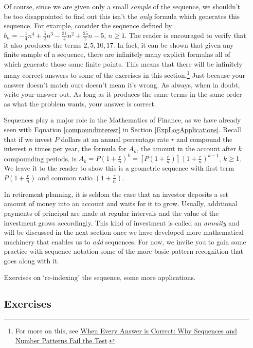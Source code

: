 Of course, since we are given only a small \textit{sample} of the sequence, we shouldn't be too disappointed to find out this isn't the \textit{only} formula which generates this sequence.  For example, consider the sequence defined by $b_{n} = -\frac{1}{4} n^4 + \frac{5}{2} n^3 - \frac{31}{4} n^2 + \frac{25}{2} n - 5$, $n \geq 1$.  The reader is encouraged to verify that it also produces the  terms  $2, 5, 10, 17$.  In fact, it can be shown that given any finite sample of a sequence, there are infinitely many explicit formulas all of which generate those same finite points.  This means that there will be infinitely many correct answers to some of the exercises in this section.\footnote{For more on this, see \href{http://www.math.kent.edu/~white/papers/pattern.pdf}{\underline{When Every Answer is Correct: Why
Sequences and Number Patterns Fail the Test}}.}  Just because your answer doesn't match ours doesn't mean it's wrong.  As always, when in doubt, write your answer out.  As long as it produces the same terms in the same order as what the problem wants, your answer is correct.  

\smallskip

Sequences play a major role in the Mathematics of Finance, as we have already seen with Equation \ref{compoundinterest} in Section \ref{ExpLogApplications}.  Recall that if we invest $P$ dollars at an annual percentage rate $r$ and compound the interest $n$ times per year,  the formula for $A_{k}$, the amount in the account after $k$ compounding periods, is $A_{k} = P\left(1 + \frac{r}{n}\right)^{k} = \left[P\left(1 + \frac{r}{n}\right)\right]\left(1 + \frac{r}{n}\right)^{k-1}$, $ k \geq 1$.  We leave it to the reader to show this is a geometric sequence with first term $P\left(1 + \frac{r}{n}\right)$ and common ratio $\left(1 + \frac{r}{n}\right)$.  

In retirement planning, it is seldom the case that an investor deposits a set amount of money into an account and waits for it to grow.  Usually, additional payments of principal are made at regular intervals and the value of the investment grows accordingly.  This kind of investment is called an \textit{annuity} and will be discussed in the next section once we have developed more mathematical machinery that enables us to \textit{add} sequences. For now, we invite you to gain some practice with sequence notation some of the more basic pattern recognition that goes along with it.

\newpage

Exercises on `re-indexing' the sequence, some more applications.

\subsection{Exercises}



\closegraphsfile